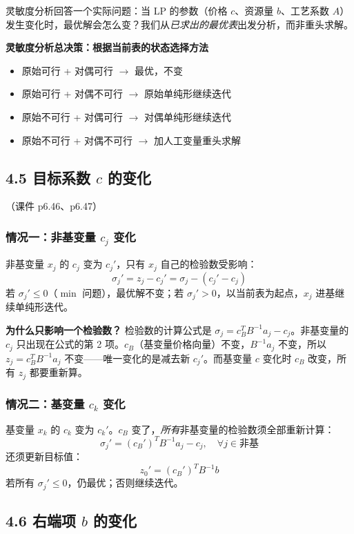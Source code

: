 灵敏度分析回答一个实际问题：当 LP 的参数（价格 $c$、资源量 $b$、工艺系数 $A$）发生变化时，最优解会怎么变？我们从\emph{已求出的最优表}出发分析，而非重头求解。

\textbf{灵敏度分析总决策：根据当前表的状态选择方法}
\begin{itemize}
  \item 原始可行 + 对偶可行 $\to$ 最优，不变
  \item 原始可行 + 对偶不可行 $\to$ 原始单纯形继续迭代
  \item 原始不可行 + 对偶可行 $\to$ 对偶单纯形继续迭代
  \item 原始不可行 + 对偶不可行 $\to$ 加人工变量重头求解
\end{itemize}

\subsection{4.5 目标系数 $c$ 的变化}

（课件 p6.46、p6.47）

\subsubsection{情况一：非基变量 $c_j$ 变化}

非基变量 $x_j$ 的 $c_j$ 变为 $c_j'$，只有 $x_j$ 自己的检验数受影响：
\[
\sigma_j' = z_j - c_j' = \sigma_j - (c_j' - c_j)
\]
若 $\sigma_j' \le 0$（$\min$ 问题），最优解不变；若 $\sigma_j' > 0$，以当前表为起点，$x_j$ 进基继续单纯形迭代。

\textbf{为什么只影响一个检验数？} 检验数的计算公式是 $\sigma_j = c_B^T B^{-1} a_j - c_j$。非基变量的 $c_j$ 只出现在公式的第 2 项。$c_B$（基变量价格向量）不变，$B^{-1}a_j$ 不变，所以 $z_j = c_B^T B^{-1}a_j$ 不变——唯一变化的是减去新 $c_j'$。而基变量 $c$ 变化时 $c_B$ 改变，所有 $z_j$ 都要重新算。

\subsubsection{情况二：基变量 $c_k$ 变化}

基变量 $x_k$ 的 $c_k$ 变为 $c_k'$。$c_B$ 变了，\emph{所有}非基变量的检验数须全部重新计算：
\[
\sigma_j' = (c_B')^T B^{-1} a_j - c_j, \quad \forall j \in \text{非基}
\]
还须更新目标值：
\[
z_0' = (c_B')^T B^{-1} b
\]
若所有 $\sigma_j' \le 0$，仍最优；否则继续迭代。

\subsection{4.6 右端项 $b$ 的变化}

